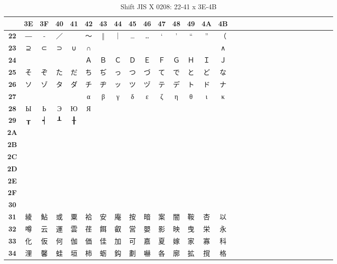\begin{table}[H]
\Fontified
\centering
\caption{Shift JIS X 0208: 22-41 x 3E-4B}
\begin{tabular}{|Sc|Sc|Sc|Sc|Sc|Sc|Sc|Sc|Sc|Sc|Sc|Sc|Sc|Sc|Sc|}
\hline
 & \textbf{3E} & \textbf{3F} & \textbf{40} & \textbf{41} & \textbf{42} & \textbf{43} & \textbf{44} & \textbf{45} & \textbf{46} & \textbf{47} & \textbf{48} & \textbf{49} & \textbf{4A} & \textbf{4B} \\ \hline
\textbf{22} & ― & ‐ & ／ & \ & 〜 & ‖ & ｜ & … & ‥ & ‘ & ’ & “ & ” & （ \\ \hline
\textbf{23} & ⊇ & ⊂ & ⊃ & ∪ & ∩ &  &  &  &  &  &  &  &  & ∧ \\ \hline
\textbf{24} &  &  &  &  & Ａ & Ｂ & Ｃ & Ｄ & Ｅ & Ｆ & Ｇ & Ｈ & Ｉ & Ｊ \\ \hline
\textbf{25} & そ & ぞ & た & だ & ち & ぢ & っ & つ & づ & て & で & と & ど & な \\ \hline
\textbf{26} & ソ & ゾ & タ & ダ & チ & ヂ & ッ & ツ & ヅ & テ & デ & ト & ド & ナ \\ \hline
\textbf{27} &  &  &  &  & α & β & γ & δ & ε & ζ & η & θ & ι & κ \\ \hline
\textbf{28} & Ы & Ь & Э & Ю & Я &  &  &  &  &  &  &  &  &  \\ \hline
\textbf{29} & ┰ & ┥ & ┸ & ╂ &  &  &  &  &  &  &  &  &  &  \\ \hline
\textbf{2A} &  &  &  &  &  &  &  &  &  &  &  &  &  &  \\ \hline
\textbf{2B} &  &  &  &  &  &  &  &  &  &  &  &  &  &  \\ \hline
\textbf{2C} &  &  &  &  &  &  &  &  &  &  &  &  &  &  \\ \hline
\textbf{2D} &  &  &  &  &  &  &  &  &  &  &  &  &  &  \\ \hline
\textbf{2E} &  &  &  &  &  &  &  &  &  &  &  &  &  &  \\ \hline
\textbf{2F} &  &  &  &  &  &  &  &  &  &  &  &  &  &  \\ \hline
\textbf{30} &  &  &  &  &  &  &  &  &  &  &  &  &  &  \\ \hline
\textbf{31} & 綾 & 鮎 & 或 & 粟 & 袷 & 安 & 庵 & 按 & 暗 & 案 & 闇 & 鞍 & 杏 & 以 \\ \hline
\textbf{32} & 噂 & 云 & 運 & 雲 & 荏 & 餌 & 叡 & 営 & 嬰 & 影 & 映 & 曳 & 栄 & 永 \\ \hline
\textbf{33} & 化 & 仮 & 何 & 伽 & 価 & 佳 & 加 & 可 & 嘉 & 夏 & 嫁 & 家 & 寡 & 科 \\ \hline
\textbf{34} & 浬 & 馨 & 蛙 & 垣 & 柿 & 蛎 & 鈎 & 劃 & 嚇 & 各 & 廓 & 拡 & 撹 & 格 \\ \hline

\end{tabular}
\end{table}
